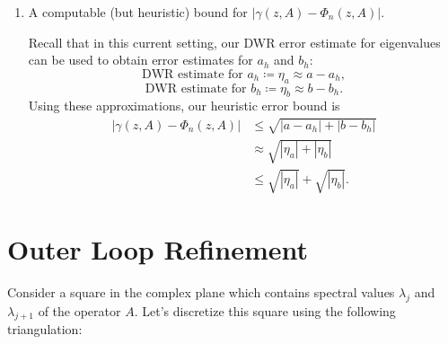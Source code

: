 \documentclass[12pt,a4paper]{article}
\theoremstyle{boldthm}
\theoremstyle{bolddefn}
\begin{document}
\begin{enumerate}[label=\textbf{Step \arabic*}]
    
    \item A computable (but heuristic) bound for $|\gamma(z, A) - \Phi_n(z, A)|.$

    Recall that in this current setting, our DWR error estimate for eigenvalues can be used to obtain error estimates for $a_h$ and $b_h:$
    \begin{equation}
        \text{DWR estimate for } a_h \coloneqq \eta_a \approx a - a_h,
    \end{equation}
    \begin{equation}
    \text{DWR estimate for } b_h \coloneqq \eta_b \approx b - b_h.
\end{equation}
Using these approximations, our heuristic error bound is 
\begin{align}
        | \gamma(z, A) - \Phi_n(z, A) | &\le \sqrt{|a-a_h| + |b-b_h|} \\
        &\approx \sqrt{|\eta_a| + |\eta_b|} \\
        &\le \sqrt{|\eta_a|} + \sqrt{|\eta_b|}.
\end{align}
\end{enumerate}

 
\section{Outer Loop Refinement}

Consider a square in the complex plane which contains spectral values $\lambda_j$ and $\lambda_{j+1}$ of the operator $A.$ Let's discretize this square using the following triangulation:
\end{document}
